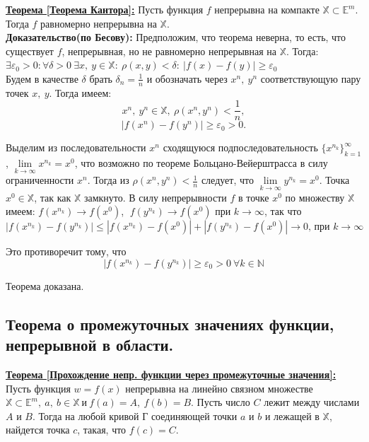 \documentclass[a4paper,12pt]{article} %
\begin{document}
\underline{\textbf{Теорема [Теорема Кантора]:}} Пусть функция $f$ непрерывна на компакте $\mathbb{X} \subset \mathbb{E}^m$. Тогда $f$
равномерно непрерывна на $\mathbb{X}$.\\

\textbf{Доказательство(по Бесову):} Предположим, что теорема неверна, то есть, что существует $f$, непрерывная, но не равномерно
непрерывная на $\mathbb{X}$. Тогда:
\\$ \exists \varepsilon_0 > 0 : \forall \delta > 0 ~\exists x, ~y \in \mathbb{X}: ~\rho(x, y) < \delta: ~ |f(x) - f(y)| \geq \varepsilon_0$
\\Будем в качестве $\delta$ брать $\delta_n = \frac{1}{n}$ и обозначать через $x^{n}, ~y^{n}$ соответствующую пару точек $x, ~y$. Тогда имеем:
$$x^{n}, ~y^{n} \in \mathbb{X}, ~\rho(x^{n}, y^{n}) < \frac{1}{n},$$
$$|f(x^{n}) - f(y^{n})| \geq \varepsilon_0 > 0.$$

Выделим из последовательности ${x^{n}}$ сходящуюся подпоследовательность $\{x^{n_k}\}_{k = 1}^\infty$,
$\lim\limits_{k \to \infty}x^{n_k} = x^{0}$, что возможно по теореме Больцано-Вейерштрасса в силу ограниченности
$x^{n}$. Тогда из $\rho(x^{n}, y^{n}) < \frac{1}{n}$ следует, что $\lim\limits_{k \to \infty}y^{n_k} = x^{0}$.
Точка $x^{0} \in \mathbb{X}$, так как $\mathbb{X}$ замкнуто. В силу непрерывности $f$ в точке
$x^{0}$ по множеству $\mathbb{X}$ имеем:
$f(x^{n_k}) \to f(x^{0})$, $\; f(y^{n_k}) \to f(x^{0})$ при $k \to \infty$, так что
$$|f(x^{n_k}) - f(y^{n_k})| \leq  |f(x^{n_k}) - f(x^{0})| + |f(y^{n_k}) - f(x^{0})| \to 0 \text{, при } k \to \infty$$

Это противоречит тому, что 
$$|f(x^{n_k}) - f(y^{n_k})| \geq \varepsilon_0 > 0 ~\forall k \in \mathbb{N}$$

Теорема доказана.

\subsection{Теорема о промежуточных значениях функции, непрерывной в области.}

\underline{\textbf{Теорема [Прохождение непр. функции через промежуточные значения]:}}\\

Пусть функция $w = f(x)$ непрерывна на линейно связном множестве $\mathbb{X} \subset \mathbb{E}^m, ~ a, ~ b \in \mathbb{X} ~ и ~ f(a) = A, ~ f(b) = B$. Пусть число $C$ лежит между числами $A$ и $B$. Тогда на любой кривой $Г$ соединяющей точки $a$ и $b$ и лежащей в $\mathbb{X}$, найдется точка $c$, такая, что $f(c) = C$.\\
\end{document}
